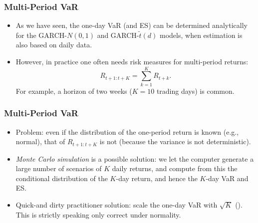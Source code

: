 \begin{frame}%

\frametitle{Multi-Period VaR}

\begin{itemize}
\item As we have seen, the one-day
VaR (and ES) can be determined analytically for the GARCH-$N(0,1)$ and GARCH-$\tilde{t}(d)$ models, when estimation is also based on
daily data.

\item However, in practice one often needs risk measures for multi-period
returns:%
\begin{equation*}
R_{t+1:t+K}=\sum_{k=1}^{K}R_{t+k}.
\end{equation*}%
For example, a horizon of two weeks ($K=10$ trading days) is common.
\end{itemize}
\end{frame}
\begin{frame}
\frametitle{Multi-Period VaR}
\begin{itemize}
\item Problem: even if the distribution of the one-period return is known (e.g., normal), that of $R_{t+1:t+K}$ is not (because the variance is not deterministic).
\item \emph{\color{red}Monte Carlo simulation} is a possible solution:
we let the computer generate a large number of scenarios of $K$ daily
returns, and compute from this the conditional distribution of the $K$-day
return, and hence the $K$-day VaR and ES.
\item Quick-and dirty practitioner solution: scale the one-day VaR with $\sqrt{K}$ (). This is strictly speaking only correct under normality.
\end{itemize}

\end{frame}%

